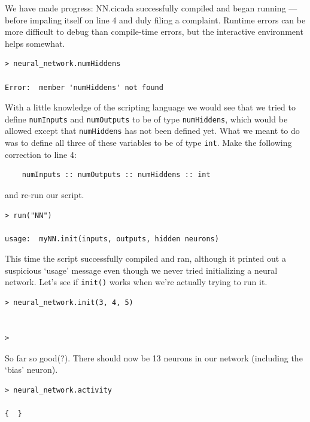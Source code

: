 \documentclass{article}
\newenvironment{code}{
       \begin{list}{}{
               \setlength{\leftmargin}{.4in}
               \setlength{\rightmargin}{0in}
               \setlength{\topsep}{.2in}
       }
       \small
       \item[] }
       { \end{list}   }
\begin{document}
We have made progress:  NN.cicada successfully compiled and began running --- before impaling itself on line 4 and duly filing a complaint.  Runtime errors can be more difficult to debug than compile-time errors, but the interactive environment helps somewhat.

\begin{code} \begin{verbatim}
> neural_network.numHiddens

Error:  member 'numHiddens' not found
\end{verbatim} \end{code}

\noindent With a little knowledge of the scripting language we would see that we tried to define \verb#numInputs# and \verb#numOutputs# to be of type \verb#numHiddens#, which would be allowed except that \verb#numHiddens# has not been defined yet.  What we meant to do was to define all three of these variables to be of type \verb#int#.  Make the following correction to line 4:

\begin{code} \begin{verbatim}
    numInputs :: numOutputs :: numHiddens :: int
\end{verbatim} \end{code}

\noindent and re-run our script.

\begin{code} \begin{verbatim}
> run("NN")

usage:  myNN.init(inputs, outputs, hidden neurons)
\end{verbatim} \end{code}

This time the script successfully compiled and ran, although it printed out a suspicious `usage' message even though we never tried initializing a neural network.  Let's see if \verb#init()# works when we're actually trying to run it.

\begin{code} \begin{verbatim}
> neural_network.init(3, 4, 5)


>
\end{verbatim} \end{code}

\noindent So far so good(?).  There should now be 13 neurons in our network (including the `bias' neuron).

\begin{code} \begin{verbatim}
> neural_network.activity

{  }
\end{verbatim} \end{code}
\end{document}
